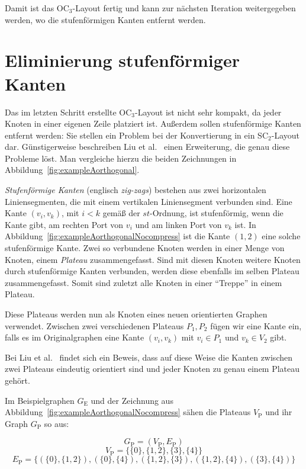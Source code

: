 \documentclass[a4paper]{scrreprt}
\theoremstyle{definition}
\begin{document}
Damit ist das OC$_3$-Layout fertig und kann zur nächsten Iteration weitergegeben werden, wo die stufenförmigen Kanten entfernt werden.


\section{Eliminierung stufenförmiger Kanten}

Das im letzten Schritt erstellte OC$_3$-Layout ist nicht sehr kompakt, da jeder Knoten in einer eigenen Zeile platziert ist. Außerdem sollen stufenförmige Kanten entfernt werden: Sie stellen ein Problem bei der Konvertierung in ein SC$_2$-Layout dar. Günstigerweise beschreiben Liu et al.~\cite{liu+etal-98} einen Erweiterung, die genau diese Probleme löst. Man vergleiche hierzu die beiden Zeichnungen in Abbildung~\ref{fig:exampleAorthogonal}.

\emph{Stufenförmige Kanten} (englisch \emph{zig-zags}) bestehen aus zwei horizontalen Liniensegmenten, die mit einem vertikalen Liniensegment verbunden sind. Eine Kante $(v_i, v_k)$, mit $i < k$ gemäß der $st$-Ordnung, ist stufenförmig, wenn die Kante gibt, am rechten Port von $v_i$ und am linken Port von $v_k$ ist. In Abbildung~\ref{fig:exampleAorthogonalNocompress} ist die Kante $(1,2)$ eine solche stufenförmige Kante. Zwei so verbundene Knoten werden in einer Menge von Knoten, einem \emph{Plateau} zusammengefasst. Sind mit diesen Knoten weitere Knoten durch stufenförmige Kanten verbunden, werden diese ebenfalls im selben Plateau zusammengefasst. Somit sind zuletzt alle Knoten in einer "`Treppe"' in einem Plateau.

Diese Plateaus werden nun als Knoten eines neuen orientierten Graphen verwendet. Zwischen zwei verschiedenen Plateaus $P_1, P_2$ fügen wir eine Kante ein, falls es im Originalgraphen eine Kante $(v_i, v_k)$ mit $v_i \in P_1$ und $v_k \in V_2$ gibt.

Bei Liu et al.~\cite{liu+etal-98} findet sich ein Beweis, dass auf diese Weise die Kanten zwischen zwei Plateaus eindeutig orientiert sind und jeder Knoten zu genau einem Plateau gehört. 

Im Beispielgraphen $G_\text{E}$ und der Zeichnung aus Abbildung~\ref{fig:exampleAorthogonalNocompress} sähen die Plateaus $V_\text{P}$ und ihr Graph $G_\text{P}$ so aus:

\[G_\text{P} = (V_\text{P}, E_\text{P})\]
\[V_\text{P} = \{\{0\}, \{1, 2\}, \{3\}, \{4\}\}\]
\[E_\text{P} = \{(\{0\}, \{1, 2\}), (\{0\}, \{4\}), (\{1, 2\}, \{3\}), (\{1, 2\}, \{4\}), (\{3\}, \{4\})\}\]
\end{document}
